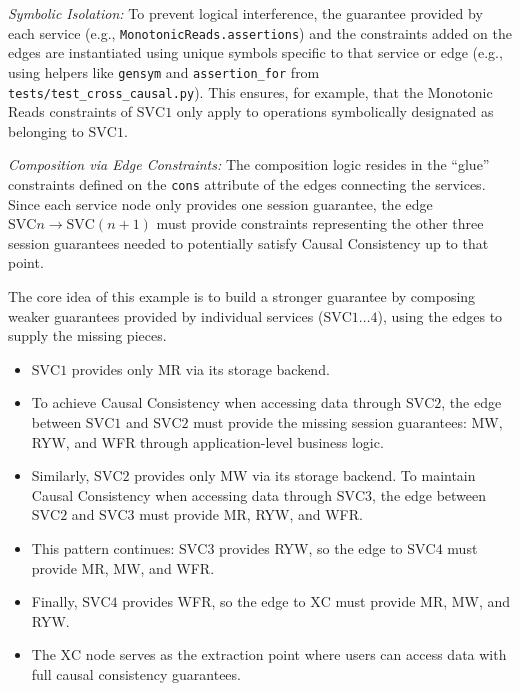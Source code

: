 \textit{Symbolic Isolation:} To prevent logical interference, the
guarantee provided by
each service (e.g., \texttt{MonotonicReads.assertions}) and the
constraints added on
the edges are instantiated using unique symbols specific to that service or edge
(e.g., using helpers like \texttt{gensym} and \texttt{assertion\_for}
from \texttt{tests/test\_cross\_causal.py}).
This ensures, for example, that the Monotonic Reads constraints of
$\text{SVC}1$ only
apply to operations symbolically designated as belonging to $\text{SVC}1$.

\textit{Composition via Edge Constraints:} The composition logic
resides in the ``glue''
constraints defined on the \texttt{cons} attribute of the edges connecting the
services. Since each service node only provides one session
guarantee, the edge $\text{SVC}n \rightarrow \text{SVC}(n+1)$ must
provide constraints representing the other three session guarantees needed to
potentially satisfy Causal Consistency up to that point.

The core idea of this example is to build a stronger guarantee by composing
weaker guarantees provided by individual services ($\text{SVC}1
\ldots 4$), using the
edges to supply the missing pieces.

\begin{itemize}
\item $\text{SVC}1$ provides only MR via its storage backend.
\item To achieve Causal Consistency when accessing data through $\text{SVC}2$,
  the edge between $\text{SVC}1$ and $\text{SVC}2$ must
  provide the missing session guarantees: MW, RYW, and WFR through
  application-level business logic.
\item Similarly, $\text{SVC}2$ provides only MW via its storage
  backend. To maintain Causal Consistency
  when accessing data through $\text{SVC}3$, the edge between
  $\text{SVC}2$ and $\text{SVC}3$ must
  provide MR, RYW, and WFR.
\item This pattern continues: $\text{SVC}3$ provides RYW, so the edge
  to $\text{SVC}4$ must provide MR, MW, and WFR.
\item Finally, $\text{SVC}4$ provides WFR, so the edge to $\text{XC}$
  must provide MR, MW, and RYW.
\item The $\text{XC}$ node serves as the extraction point where users
  can access data with full causal consistency guarantees.
\end{itemize}

